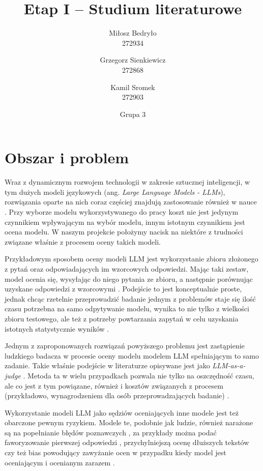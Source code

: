 \documentclass[11pt,a4paper]{article}
\title{Etap I -- Studium literaturowe}
\author{%
  \small Miłosz Bedryło\\\small 272934 \and
  \small Grzegorz Sienkiewicz\\\small 272868 \and
  \small Kamil Sromek\\\small 272903
}
\date{\small Grupa 3}
\begin{document}
\maketitle
\vspace{-1.5em}

\section*{Obszar i problem}
Wraz z dynamicznym rozwojem technologii w zakresie sztucznej inteligencji, w tym dużych modeli językowych (ang. \emph{Large Language Models - LLMs}), rozwiązania oparte na nich coraz częściej znajdują zastosowanie również w nauce \cite{guetal2026a}. Przy wyborze modelu wykorzystywanego do pracy koszt nie jest jedynym czynnikiem wpływającym na wybór modelu, innym istotnym czynnikiem jest ocena modelu. W naszym projekcie położymy nacisk na niektóre z trudności związane właśnie z procesem oceny takich modeli.

Przykładowym sposobem oceny modeli LLM jest wykorzystanie zbioru złożonego z pytań oraz odpowiadających im wzorcowych odpowiedzi. Mając taki zestaw, model ocenia się, wysyłając do niego pytania ze zbioru, a następnie porównując uzyskane odpowiedzi z wzorcowymi \cite{zhengetal2023c,chenetal2024a}. Podejście to jest konceptualnie proste, jednak chcąc rzetelnie przeprowadzić badanie jednym z problemów staje się ilość czasu potrzebna na samo odpytywanie modelu, wynika to nie tylko z wielkości zbioru testowego, ale też z potrzeby powtarzania zapytań w celu uzyskania istotnych statystycznie wyników \cite{yagubyan2026,lee2026how}. 

Jednym z zaproponowanych rozwiązań powyższego problemu jest zastąpienie ludzkiego badacza w procesie oceny modelu modelem LLM spełniającym to samo zadanie. Takie właśnie podejście w literaturze opisywane jest jako \emph{LLM-as-a-judge} \cite{zhengetal2023c,guetal2026a}. Metoda ta w wielu przypadkach pozwala nie tylko na oszczędność czasu, ale co jest z tym powiązane, również i kosztów związanych z procesem (przykładowo, wynagrodzeniem dla osób przeprowadzających badanie) \cite{zhengetal2023c,wangetal2024}.

Wykorzystanie modeli LLM jako sędziów oceniających inne modele jest też obarczone pewnym ryzykiem. Modele te, podobnie jak ludzie, również narażone są na popełnianie błędów poznawczych \cite{kooetal2024a,ICLR2025_fdca08d3,chenetal2024a}, za przykłady można podać faworyzowanie pierwszej odpowiedzi \cite{wangetal2024,shietal2025a}, przychylniejszą ocenę dłuższych tekstów \cite{zhengetal2023c,parketal2024a,soumik2026} czy też bias powodujący zawyżanie ocen w przypadku kiedy model jest oceniającym i ocenianym zarazem \cite{panicksseryetal2024b,wataokaetal2025,yangetal2026a}.
\end{document}
